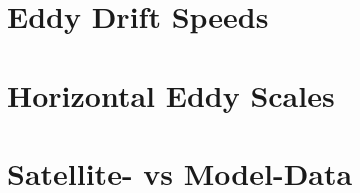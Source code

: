 \label{chap:THEORY}

\section{Eddy Drift Speeds}\label{subsec:speeds}

\section{Horizontal Eddy Scales}\label{subsec:horScales}

\section{Satellite- vs Model-Data} \label{sec:satvsmod}

